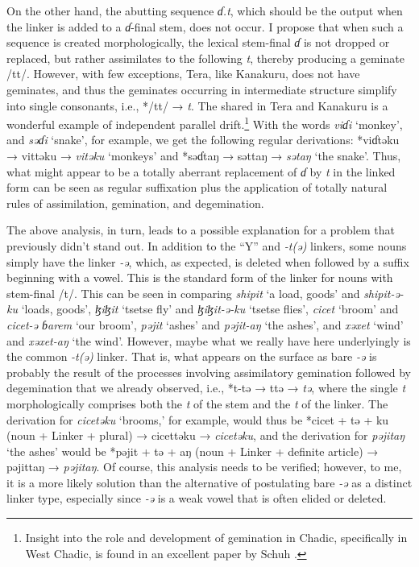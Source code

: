 \documentclass[output=paper,colorlinks,citecolor=brown]{langscibook}
\begin{document}
On the other hand, the abutting  sequence \textit{ɗ.t}, which should be the output when the linker is added to a \textit{ɗ}-final stem, does not occur. I propose that when such a sequence is created morphologically, the lexical stem-final \textit{ɗ} is not dropped or replaced, but rather assimilates to the following \textit{t}, thereby producing a geminate /tt/. However, with few exceptions, Tera, like Kanakuru, does not have geminates, and thus the geminates occurring in intermediate structure simplify into single consonants, i.e., */tt/ → \textit{t}. The shared  in Tera and Kanakuru is a wonderful example of independent parallel drift.\footnote{Insight into the role and development of gemination in Chadic, specifically in West Chadic, is found in an excellent paper by Schuh \citeyearpar{Schuh2001}.} With the words \textit{viɗi} `monkey’, and \textit{sǝɗi} `snake’, for example, we get the following regular derivations: *viɗtǝku  → vittǝku → \textit{vitǝku} `monkeys' and *sǝɗtaŋ → sǝttaŋ → \textit{sǝtaŋ} `the snake’. Thus, what might appear to be a totally aberrant replacement of \textit{ɗ} by \textit{t} in the linked form can be seen as regular suffixation plus the application of totally natural rules of assimilation, gemination, and degemination.

The above analysis, in turn, leads to a possible explanation for a problem that previously didn’t stand out. In addition to the “Y” and \textit{-t(ǝ)} linkers, some nouns simply have the linker \textit{-ǝ}, which, as expected, is deleted when followed by a suffix beginning with a vowel. This is the standard form of the linker for nouns with stem-final /t/. This can be seen in comparing \textit{shipit} `a load, goods’ and \textit{shipit-ǝ-ku} `loads, goods', \textit{ɮiɮit} `tsetse fly’ and \textit{ɮiɮit-ǝ-ku} `tsetse flies', \textit{cicet} `broom’ and \textit{cicet-ǝ ɓarem} `our broom’, \textit{pǝjit} `ashes’ and \textit{pǝjit-aŋ} `the ashes’, and \textit{xǝxet} `wind’ and \textit{xǝxet-aŋ} `the wind’. However, maybe what we really have here underlyingly is the common \textit{-t(ǝ)} linker. That is, what appears on the surface as bare \textit{-ǝ} is probably the result of the processes involving assimilatory gemination followed by degemination that we already observed, i.e., *t-tǝ → ttǝ → \textit{tǝ}, where the single \textit{t} morphologically comprises both the \textit{t} of the stem and the \textit{t} of the linker. The derivation for \textit{cicetǝku} `brooms,’ for example, would thus be *cicet + tǝ + ku (noun + Linker + plural) → cicettǝku → \textit{cicetǝku}, and the derivation for \textit{pǝjitaŋ} `the ashes’ would be *pǝjit + tǝ + aŋ (noun + Linker + definite article) → pǝjittaŋ → \textit{pǝjitaŋ}. Of course, this analysis needs to be verified; however, to me, it is a more likely solution than the alternative of postulating bare \textit{-ǝ} as a distinct linker type, especially since \textit{-ǝ} is a weak vowel that is often elided or deleted.
\end{document}
